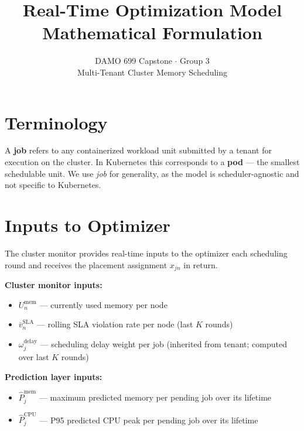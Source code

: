 \documentclass[11pt]{article}
\title{\textbf{Real-Time Optimization Model}\\[0.5em]
       \large Mathematical Formulation}
\author{DAMO 699 Capstone $\cdot$ Group 3\\
        Multi-Tenant Cluster Memory Scheduling}
\date{}
\newcommand{\vbarsla}{\bar{v}_n^{\text{SLA}}}
\newcommand{\Umem}{U_n^{\text{mem}}}
\newcommand{\omdelay}{\omega_j^{\text{delay}}}
\newcommand{\Pmem}{\hat{P}_j^{\text{mem}}}
\newcommand{\Pcpu}{\hat{P}_j^{\text{CPU}}}
\begin{document}
\maketitle
\tableofcontents
\newpage

\section*{Terminology}

A \textbf{job} refers to any containerized workload unit submitted by a tenant
for execution on the cluster. In Kubernetes this corresponds to a \textbf{pod}
--- the smallest schedulable unit. We use \emph{job} for generality, as the
model is scheduler-agnostic and not specific to Kubernetes.

\section{Inputs to Optimizer}

The cluster monitor provides real-time inputs to the optimizer each scheduling
round and receives the placement assignment $x_{jn}$ in return.

\medskip
\noindent\textbf{Cluster monitor inputs:}
\begin{itemize}[noitemsep, topsep=2pt]
  \item $\Umem$ --- currently used memory per node
  \item $\vbarsla$ --- rolling SLA violation rate per node (last $K$ rounds)
  \item $\omdelay$ --- scheduling delay weight per job (inherited from tenant;
    computed over last $K$ rounds)
\end{itemize}

\medskip
\noindent\textbf{Prediction layer inputs:}
\begin{itemize}[noitemsep, topsep=2pt]
  \item $\Pmem$ --- maximum predicted memory per pending job over its lifetime
  \item $\Pcpu$ --- P95 predicted CPU peak per pending job over its lifetime
\end{itemize}
\end{document}
